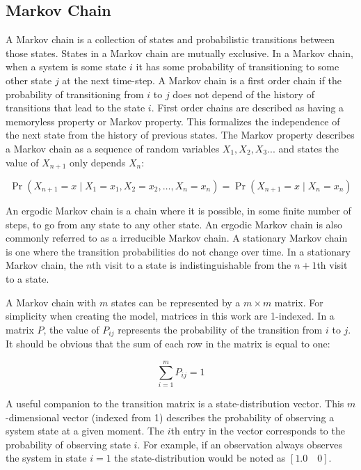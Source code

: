\subsection{Markov Chain}


A Markov chain is a collection of states and probabilistic transitions between those states.
States in a Markov chain are mutually exclusive.
In a Markov chain, when a system is some state $i$ it has some probability of transitioning to some other state $j$ at the next time-step.
A Markov chain is a first order chain if the probability of transitioning from $i$ to $j$ does not depend of the history of transitions that lead to the state $i$.
First order chains are described as having a memoryless property or Markov property.
This formalizes the independence of the next state from the history of previous states.
The Markov property describes a Markov chain as a sequence of random variables $X_{1}, X_{2}, X_{3}...$ and states the value of $X_{n+1}$ only depends $X_{n}$: \cite{MARKOV3}

\[ \Pr(X_{n+1}=x\mid X_1=x_1, X_2=x_2, \ldots, X_n=x_n) = \Pr(X_{n+1}=x\mid X_n=x_n) \]

An ergodic Markov chain is a chain where it is possible, in some finite number of steps, to go from any state to any other state.
An ergodic Markov chain is also commonly referred to as a irreducible Markov chain.
A stationary Markov chain is one where the transition probabilities do not change over time.
In a stationary Markov chain, the $n$th visit to a state is indistinguishable from the $n+1$th visit to a state.

A Markov chain with $m$ states can be represented by a $m\times m$ matrix.
For simplicity when creating the model, matrices in this work are 1-indexed.
In a matrix $P$, the value of $P_{ij}$ represents the probability of the transition from $i$ to $j$.
It should be obvious that the sum of each row in the matrix is equal to one:

\[ \sum_{i=1}^{m} P_{ij} = 1 \]

A useful companion to the transition matrix is a state-distribution vector.
This $m$-dimensional vector (indexed from 1) describes the probability of observing a system state at a given moment.
The $i$th entry in the vector corresponds to the probability of observing state $i$.
For example, if an observation always observes the system in state $i=1$ the state-distribution would be noted as $[1.0 \quad 0]$.

